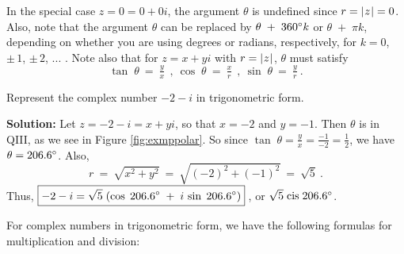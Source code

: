 In the special case $z=0 = 0+0i$, the argument $\theta$ is undefined since $r=\lvert\mspace{1mu}z\mspace{1mu}\rvert=0$. Also, note
that the argument $\theta$ can be replaced by $\theta \;+\; 360^\circ k$ or $\theta \;+\; \pi k$,
depending on whether you are using degrees or radians, respectively, for $k=0$, $\pm\,1$, $\pm\,2$,
$...$ . Note also that for $z=x+yi$ with $r=\lvert\mspace{1mu}z\mspace{1mu}\rvert$, $\theta$ must satisfy
\begin{displaymath}
 \tan\;\theta ~=~ \tfrac{y}{x}~~,~ \cos\;\theta ~=~ \tfrac{x}{r}~~,~ \sin\;\theta ~=~ \tfrac{y}{r}~.
\end{displaymath}
\newpage
\begin{exmp}
\piccaption[]{\label{fig:exmppolar}}
\noindent Represent the complex number $-2 - i$ in trigonometric form.\vspace{1mm}
 \par\noindent\textbf{Solution:} Let $z=-2-i=x+yi$, so that $x=-2$ and $y=-1$. Then $\theta$ is in
  QIII, as we see in Figure \ref{fig:exmppolar}. So since $\tan\;\theta = \tfrac{y}{x} =
  \tfrac{-1}{-2} = \tfrac{1}{2}$, we have $\theta = 206.6^\circ$. Also,
 \begin{displaymath}
  r ~=~ \sqrt{x^2 + y^2} ~=~ \sqrt{(-2)^2 + (-1)^2} ~=~ \sqrt{5} ~.
 \end{displaymath}
 Thus, $\boxed{-2 - i = \sqrt{5}\;(\cos\;206.6^\circ \;+\; i\,\sin\;206.6^\circ)}\;$, or
 $\sqrt{5}\;\text{cis}\;206.6^\circ$.
\end{exmp}
\divider
\vspace{1mm}

For complex numbers in trigonometric form, we have the following formulas for multiplication and
division:

\begin{center}\end{center}

